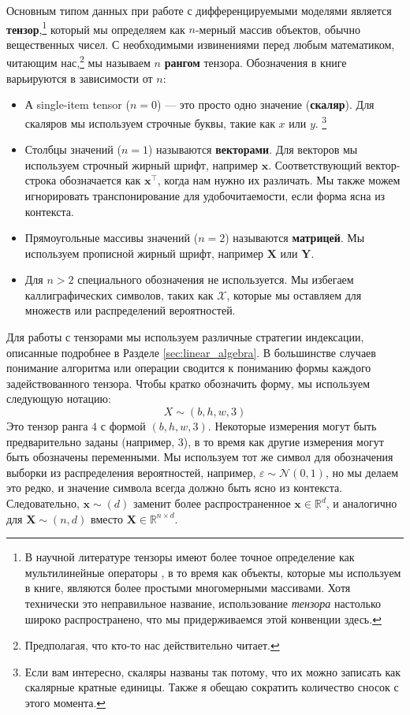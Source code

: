 Основным типом данных при работе с дифференцируемыми моделями является \textbf{тензор},\footnote{В научной литературе тензоры имеют более точное определение как мультилинейные операторы \cite{lim2021tensors}, в то время как объекты, которые мы используем в книге, являются более простыми многомерными массивами. Хотя технически это неправильное название, использование \textit{тензора} настолько широко распространено, что мы придерживаемся этой конвенции здесь.} который мы определяем как $n$-мерный массив объектов, обычно вещественных чисел. С необходимыми извинениями перед любым математиком, читающим нас,\footnote{Предполагая, что кто-то нас действительно читает.} мы называем $n$ \textbf{рангом} тензора. Обозначения в книге варьируются в зависимости от $n$:
%
\begin{itemize}
    \item А single-item tensor ($n=0$) — это просто одно значение (\textbf{скаляр}). Для скаляров мы используем строчные буквы, такие как $x$ или $y$. \footnote{Если вам интересно, скаляры названы так потому, что их можно записать как скалярные кратные единицы. Также я обещаю сократить количество сносок с этого момента.}
    \item Столбцы значений ($n=1$) называются \textbf{векторами}. Для векторов мы используем строчный жирный шрифт, например $\mathbf{x}$. Соответствующий вектор-строка обозначается как $\mathbf{x}^\top$, когда нам нужно их различать. Мы также можем игнорировать транспонирование для удобочитаемости, если форма ясна из контекста.
    \item Прямоугольные массивы значений ($n=2$) называются \textbf{матрицей}. Мы используем прописной жирный шрифт, например $\mathbf{X}$ или $\mathbf{Y}$.
    \item Для $n > 2$ специального обозначения не используется. Мы избегаем каллиграфических символов, таких как $\mathcal{X}$, которые мы оставляем для множеств или распределений вероятностей.
\end{itemize}
%
Для работы с тензорами мы используем различные стратегии индексации, описанные подробнее в Разделе \ref{sec:linear_algebra}. В большинстве случаев понимание алгоритма или операции сводится к пониманию формы каждого задействованного тензора. Чтобы кратко обозначить форму, мы используем следующую нотацию:
%
$$
X \sim(b,h,w,3)
$$
%
Это тензор ранга $4$ с формой $(b,h,w,3)$. Некоторые измерения могут быть предварительно заданы (например, $3$), в то время как другие измерения могут быть обозначены переменными. Мы используем тот же символ для обозначения выборки из распределения вероятностей, например, $\varepsilon \sim \mathcal{N}(0,1)$, но мы делаем это редко, и значение символа всегда должно быть ясно из контекста. Следовательно, $\mathbf{x} \sim (d)$ заменит более распространенное $\mathbf{x} \in \mathbb{R}^d$, и аналогично для $\mathbf{X} \sim (n,d)$ вместо $\mathbf{X} \in \mathbb{R}^{n \times d}$.
